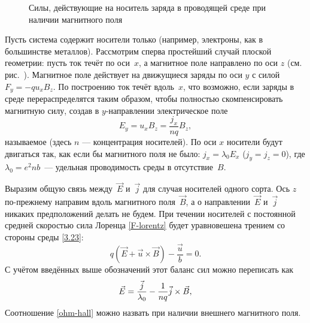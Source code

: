 \begin{wrapfigure}{o}{0.5\textwidth}
\centering
    \caption{Силы, действующие на носитель заряда в проводящей среде
    при наличии магнитного поля}
\end{wrapfigure}

Пусть система содержит носители только 
(например, электроны, как в большинстве металлов).
Рассмотрим сперва простейший случай плоской геометрии:
пусть ток течёт по оси~$x$, а магнитное поле направлено по оси $z$
(см. рис.~).
Магнитное поле действует на движущиеся заряды по оси $y$ с силой $F_y=-qu_xB_z$.
По построению ток течёт вдоль~$x$, что возможно,
если заряды в среде перераспределятся таким образом, чтобы полностью
скомпенсировать магнитную силу, создав в $y$-направлении электрическое поле
\begin{equation*}
E_y=u_x B_z=\frac{j_x}{nq} B_z,
\end{equation*}
называемое  (здесь $n$ --- концентрация носителей).
По оси $x$ носители будут двигаться так, как если бы магнитного поля не было:
$j_x=\lambda_0 E_x$ ($j_y=j_z=0$), где $\lambda_0 = e^2nb$~---
удельная проводимость среды в отсутствие~$B$.

Выразим общую связь между~$\vec{E}$ и~$\vec{j}$ для случая носителей одного сорта.
Ось $z$ по-прежнему направим вдоль магнитного поля~$\vec{B}$, а о
направлении~$\vec{E}$ и~$\vec{j}$ никаких предположений делать не будем.
При течении носителей с постоянной средней скоростью сила Лоренца
\eqref{F-lorentz} будет уравновешена трением со стороны среды \eqref{3.23}:
\begin{equation*}
    q(\vec{E}+\vec{u}\times \vec{B}) - \frac{\vec{u}}{b} =0.
\end{equation*}
С учётом введённых выше обозначений этот баланс сил можно переписать как
\begin{equation}
    \eqmark{ohm-hall}
    \vec{E} = \frac{\vec{j}}{\lambda_0} -
    \frac{1}{nq} \vec{j}\times\vec{B},
\end{equation}
Соотношение \eqref{ohm-hall} можно назвать  при
наличии внешнего магнитного поля.

